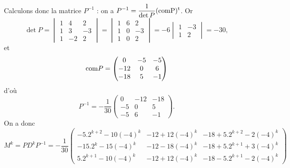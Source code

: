 {\begin{enumerate}
{Calculons donc la matrice $P^{-1}$ : on a $\displaystyle P^{-1}={\frac{1}{\det P}}(\rm{com} P)^t$. Or
$$\det P=\begin{vmatrix}1&4&2 \\ 1&3&-3 \\ 1&-2&2\end{vmatrix}=\begin{vmatrix}1&6&2 \\ 1&0&-3 \\ 1&0&2\end{vmatrix}=
-6\begin{vmatrix}1&-3 \\ 1&2\end{vmatrix}=-30,$$ et
$${\rm com}P=\begin{pmatrix}0&-5&-5 \\ -12&0&6 \\ -18&5&-1\end{pmatrix}$$ d'o\`u
$$P^{-1}=-{\frac{1}{30}}\begin{pmatrix}0&-12&-18 \\ -5&0&5 \\ -5&6&-1\end{pmatrix}.$$
On a donc 
$$M^k=PD^kP^{-1}=-{\frac{1}{30}}
\begin{pmatrix}-5.2^{k+2}-10(-4)^k&-12+12(-4)^k&-18+5.2^{k+2}-2(-4)^k \\ 
-15.2^{k}-15(-4)^k&-12-18(-4)^k&-18+5.2^{k+1}+3(-4)^k \\ 
5.2^{k+1}-10(-4)^k&-12+12(-4)^k&-18-5.2^{k+1}-2(-4)^k\end{pmatrix}$$}
\end{enumerate}
}
